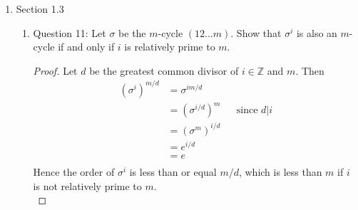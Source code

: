 \documentclass{article}
\begin{document}
\begin{enumerate}
  \item Section 1.3
    \begin{enumerate}
      \item Question 11: Let $\sigma$ be the $m$-cycle $(1 2 \ldots m)$.
        Show that $\sigma^i$ is also an $m$-cycle if and only if $i$ is
        relatively prime to $m$.
        \begin{proof}
          Let $d$ be the greatest common divisor of $i\in\mathbb{Z}$ and $m$.
          Then
          \begin{align*}
            (\sigma^{i})^{m/d}  &= \sigma^{im/d}      && \\
                                &= (\sigma^{i/d})^m   && \text{since $d|i$} \\
                                &= (\sigma^m)^{i/d}   && \\
                                &= e^{i/d}            && \\
                                &= e                  && \\
          \end{align*}
          Hence the order of $\sigma^i$ is less than or equal $m/d$, which
          is less than $m$ if $i$ is not relatively prime to $m$. \\


\end{proof}
\end{enumerate}
\end{enumerate}
\end{document}
